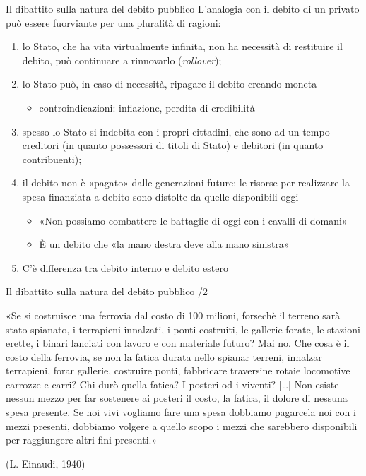 \documentclass[aspectratio=149,11pt,italian]{beamer}
\begin{document}
\begin{frame}{Il dibattito sulla natura del debito pubblico}
L'analogia con il debito di un privato può essere fuorviante per una pluralità
di ragioni:
\begin{enumerate}
\item lo Stato, che ha vita virtualmente infinita, non ha necessità di restituire
il debito, può continuare a rinnovarlo (\emph{rollover});
\item lo Stato può, in caso di necessità, ripagare il debito creando moneta
\begin{itemize}
\item controindicazioni: inflazione, perdita di credibilità
\end{itemize}
\item spesso lo Stato si indebita con i propri cittadini, che sono ad un tempo
creditori (in quanto possessori di titoli di Stato) e debitori (in quanto
contribuenti);
\item il debito non è «pagato» dalle generazioni future: le risorse per
realizzare la spesa finanziata a debito sono distolte da quelle disponibili
oggi
\begin{itemize}
\item «Non possiamo combattere le battaglie di oggi con i cavalli di domani»
\item È un debito che «la mano destra deve alla mano sinistra»
\end{itemize}
\item C'è differenza tra debito interno e debito estero
\end{enumerate}
\end{frame}

\begin{frame}{Il dibattito sulla natura del debito pubblico /2}
\begin{quoting}
\footnotesize
«Se si costruisce una ferrovia dal costo di 100 milioni, forsechè il terreno
sarà stato spianato, i terrapieni innalzati, i ponti costruiti, le gallerie forate, le stazioni erette, i binari lanciati con lavoro e con materiale futuro?
Mai no. Che cosa è il costo della ferrovia, se non la fatica durata nello
spianar terreni, innalzar terrapieni, forar gallerie, costruire ponti, fabbricare traversine rotaie locomotive carrozze e carri? Chi durò quella fatica?
I posteri od i viventi? […] Non esiste nessun mezzo per far sostenere ai
posteri il costo, la fatica, il dolore di nessuna spesa presente. Se noi vivi vogliamo fare una spesa dobbiamo pagarcela noi con i mezzi presenti,
dobbiamo volgere a quello scopo i mezzi che sarebbero disponibili per
raggiungere altri fini presenti.»

(L. Einaudi, 1940)
\end{quoting}
\end{frame}
\end{document}

